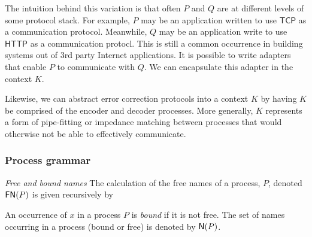 The intuition behind this variation is that often $P$ and $Q$ are at
different levels of some protocol stack. For example, $P$ may be an
application written to use $\mathsf{TCP}$ as a communication
protocol. Meanwhile, $Q$ may be an application write to use
$\mathsf{HTTP}$ as a communication protocl. This is still a common
occurrence in building systems out of 3rd party Internet
applications. It is possible to write adapters that enable $P$ to
communicate with $Q$. We can encapsulate this adapter in the context
$K$.

Likewise, we can abstract error correction protocols into a context
$K$ by having $K$ be comprised of the encoder and decoder
processes. More generally, $K$ represents a form of pipe-fitting or
impedance matching between processes that would otherwise not be able
to effectively communicate.

\subsubsection{Process grammar}\label{subsub:process_grammar}


\begin{definition}
  \emph{Free and bound names} The calculation of the free names of a
  process, $P$, denoted $\mathsf{FN}(P)$ is given recursively by
  
  
  An occurrence of $x$ in a process $P$ is \textit{bound} if it is not
  free. The set of names occurring in a process (bound or free) is
  denoted by $\mathsf{N}(P)$.
\end{definition}

